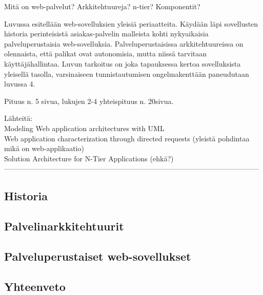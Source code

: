 Mitä on web-palvelut? Arkkitehtuureja? n-tier? Komponentit?

Luvussa esitellään web-sovelluksien yleisiä periaatteita. Käydään läpi sovellusten historia perinteisistä asiakas-palvelin malleista kohti nykyaikaisia palveluperustaisia web-sovelluksia. Palveluperustaisissa arkkitehtuureissa on olennaista, että palikat ovat autonomisia, mutta niissä tarvitaan käyttäjähallintaa. Luvun tarkoitus on joka tapauksessa kertoa sovelluksista yleisellä tasolla, varsinaiseen tunnistautumisen ongelmakenttään paneudutaan luvussa 4.

Pituus n. 5 sivua, lukujen 2-4 yhteispituus n. 20sivua.

Lähteitä:\\
Modeling Web application architectures with UML \cite{uml}\\
Web application characterization through directed requests \cite{webapps} (yleistä pohdintaa mikä on web-applikaatio)\\
Solution Architecture for N-Tier Applications \cite{n-tier} (ehkä?)\\

-----------------------------------------------------------------------------------------------------------


\subsection{Historia}

\subsection{Palvelinarkkitehtuurit}

\subsection{Palveluperustaiset web-sovellukset}

\subsection{Yhteenveto}

